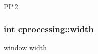 \-P\-I$\ast$2 \hypertarget{namespacecprocessing_a7af937eb8772235def57fcadd10fc82a}{
\subsubsection[{width}]{\setlength{\rightskip}{0pt plus 5cm}int {\bf cprocessing\-::width}}}\label{namespacecprocessing_a7af937eb8772235def57fcadd10fc82a}


window width 

